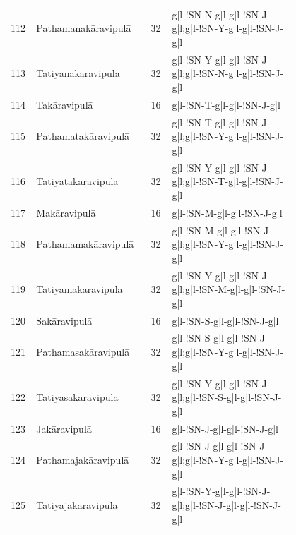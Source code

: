 {\begin{longtable}[c]{p{0.04\linewidth}p{0.30\linewidth}p{0.06\linewidth}p{0.40\linewidth}}
112 & Pathamanakāravipulā & 32 & g|l-!SN-N-g|l-g|l-!SN-J-g|l;\newline g|l-!SN-Y-g|l-g|l-!SN-J-g|l \\
113 & Tatiyanakāravipulā & 32 & g|l-!SN-Y-g|l-g|l-!SN-J-g|l;\newline g|l-!SN-N-g|l-g|l-!SN-J-g|l \\
114 & Takāravipulā & 16 & g|l-!SN-T-g|l-g|l-!SN-J-g|l \\
115 & Pathamatakāravipulā & 32 & g|l-!SN-T-g|l-g|l-!SN-J-g|l;\newline g|l-!SN-Y-g|l-g|l-!SN-J-g|l \\
116 & Tatiyatakāravipulā & 32 & g|l-!SN-Y-g|l-g|l-!SN-J-g|l;\newline g|l-!SN-T-g|l-g|l-!SN-J-g|l \\
117 & Makāravipulā & 16 & g|l-!SN-M-g|l-g|l-!SN-J-g|l \\
118 & \mbox{Pathamamakāravipulā} & 32 & g|l-!SN-M-g|l-g|l-!SN-J-g|l;\newline g|l-!SN-Y-g|l-g|l-!SN-J-g|l \\
119 & Tatiyamakāravipulā & 32 & g|l-!SN-Y-g|l-g|l-!SN-J-g|l;\newline g|l-!SN-M-g|l-g|l-!SN-J-g|l \\
120 & Sakāravipulā & 16 & g|l-!SN-S-g|l-g|l-!SN-J-g|l \\
121 & Pathamasakāravipulā & 32 & g|l-!SN-S-g|l-g|l-!SN-J-g|l;\newline g|l-!SN-Y-g|l-g|l-!SN-J-g|l \\
122 & Tatiyasakāravipulā & 32 & g|l-!SN-Y-g|l-g|l-!SN-J-g|l;\newline g|l-!SN-S-g|l-g|l-!SN-J-g|l \\
123 & Jakāravipulā & 16 & g|l-!SN-J-g|l-g|l-!SN-J-g|l \\
124 & Pathamajakāravipulā & 32 & g|l-!SN-J-g|l-g|l-!SN-J-g|l;\newline g|l-!SN-Y-g|l-g|l-!SN-J-g|l \\
125 & Tatiyajakāravipulā & 32 & g|l-!SN-Y-g|l-g|l-!SN-J-g|l;\newline g|l-!SN-J-g|l-g|l-!SN-J-g|l \\
\end{longtable}
}
